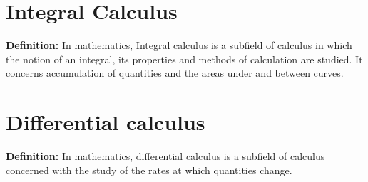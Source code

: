 \section{Integral Calculus}
\textbf{Definition:} In mathematics, Integral calculus is a subfield of calculus in which the notion of an integral, its properties and methods of calculation are studied. It concerns accumulation of quantities and the areas under and between curves.


\section{Differential calculus}
\textbf{Definition:} In mathematics, differential calculus is a subfield of calculus concerned with the study of the rates at which quantities change.

